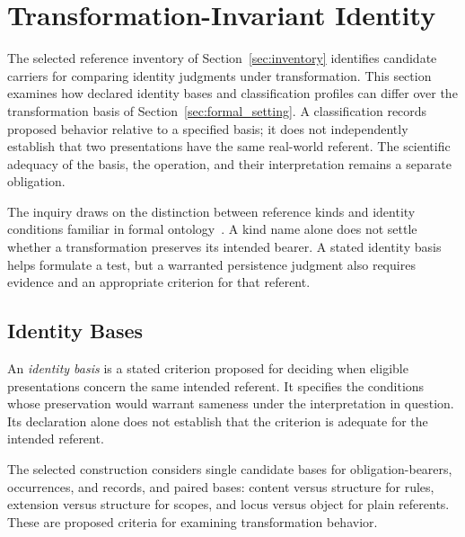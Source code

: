 
\section{Transformation-Invariant Identity}
\label{sec:algebra}

The selected reference inventory of Section~\ref{sec:inventory} identifies
candidate carriers for comparing identity judgments under transformation.
This section examines how declared identity bases and classification profiles
can differ over the transformation basis of
Section~\ref{sec:formal_setting}.
A classification records proposed behavior relative to a specified basis;
it does not independently establish that two presentations have the same
real-world referent.
The scientific adequacy of the basis, the operation,
and their interpretation remains a separate obligation.

The inquiry draws on the distinction between reference kinds and identity
conditions familiar in formal ontology~\citep{guarino1998roles,guarinowelty2002}.
A kind name alone does not settle whether a transformation preserves its
intended bearer.
A stated identity basis helps formulate a test, but a
warranted persistence judgment also requires evidence and an appropriate
criterion for that referent.

\subsection{Identity Bases}
\label{subsec:identity_bases}

\begin{definition}
  \label{se200.def.IdentityBasis}
  An \emph{identity basis} is a stated criterion proposed for deciding when
  eligible presentations concern the same intended referent.
  It specifies
  the conditions whose preservation would warrant sameness under the
  interpretation in question.
  Its declaration alone does not establish
  that the criterion is adequate for the intended referent.
\end{definition}

The selected construction considers single candidate bases for
obligation-bearers, occurrences, and records, and paired bases:
content versus structure for rules, extension versus structure for scopes,
and locus versus object for plain referents.
These are proposed criteria for examining transformation behavior.

